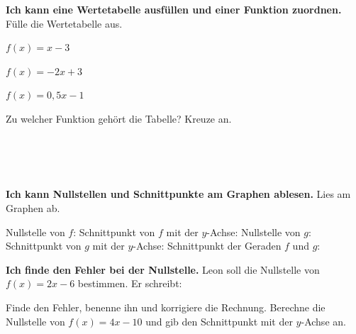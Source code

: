 \begin{aufgabe}{\textbf{Ich kann eine Wertetabelle ausfüllen und einer Funktion zuordnen.} Fülle die Wertetabelle aus.}
\begin{teile}
\teil $f(x) = x - 3$ \par {}
\teil $f(x) = -2x + 3$ \par {}
\teil $f(x) = 0{,}5x - 1$ \par {}
\end{teile}
Zu welcher Funktion gehört die Tabelle? Kreuze an.
\begin{teile}
\teil {} \par
{} \\  \\  \\ 
\end{teile}
\end{aufgabe}

\begin{aufgabe}{\textbf{Ich kann Nullstellen und Schnittpunkte am Graphen ablesen.} Lies am Graphen ab.}

\begin{ksys}[xmin=-2,xmax=6,ymin=-5,ymax=6,ablesen]
\end{ksys}

\begin{teile}
\teil Nullstelle von $f$: \quad {}
\teil Schnittpunkt von $f$ mit der $y$-Achse: \quad \leerfeld
\teil Nullstelle von $g$: \quad {}
\teil Schnittpunkt von $g$ mit der $y$-Achse: \quad \leerfeld
\teil Schnittpunkt der Geraden $f$ und $g$: \quad \leerfeld
\end{teile}
\end{aufgabe}

\begin{aufgabe}{\textbf{Ich finde den Fehler bei der Nullstelle.} Leon soll die Nullstelle von $f(x) = 2x - 6$ bestimmen. Er schreibt:}
\begin{teile}
\teil Finde den Fehler, benenne ihn und korrigiere die Rechnung.
\teil Berechne die Nullstelle von $f(x) = 4x - 10$ und gib den Schnittpunkt mit der $y$-Achse an.
\end{teile}
\end{aufgabe}

